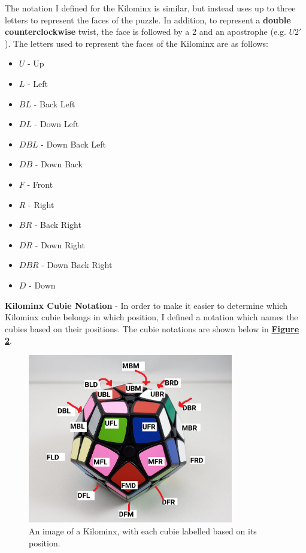 The notation I defined for the Kilominx is similar, but instead uses up to three letters to represent the faces of the puzzle. In addition, to represent a \textbf{double counterclockwise} twist, the face is followed by a 2 and an apostrophe (e.g. $U2'$). The letters used to represent the faces of the Kilominx are as follows:
\begin{multicols}{2}
\begin{itemize}
    \item $U$ - Up
    \item $L$ - Left
    \item $BL$ - Back Left
    \item $DL$ - Down Left
    \item $DBL$ - Down Back Left
    \item $DB$ - Down Back 
    \item $F$ - Front
    \item $R$ - Right
    \item $BR$ - Back Right
    \item $DR$ - Down Right
    \item $DBR$ - Down Back Right
    \item $D$ - Down
\end{itemize}
\end{multicols}

\textbf{Kilominx Cubie Notation} - In order to make it easier to determine which Kilominx cubie belongs in which position, I defined a notation which names the cubies based on their positions. The cubie notations are shown below in \textbf{\hyperref[fig:kubies]{Figure 2}}.

\begin{figure}[h]
    \includegraphics[width=0.8\textwidth]{kilominx_indices_guide}
    \centering
    \caption{An image of a Kilominx, with each cubie labelled based on its position.}
\end{figure}
\label{fig:kubies}